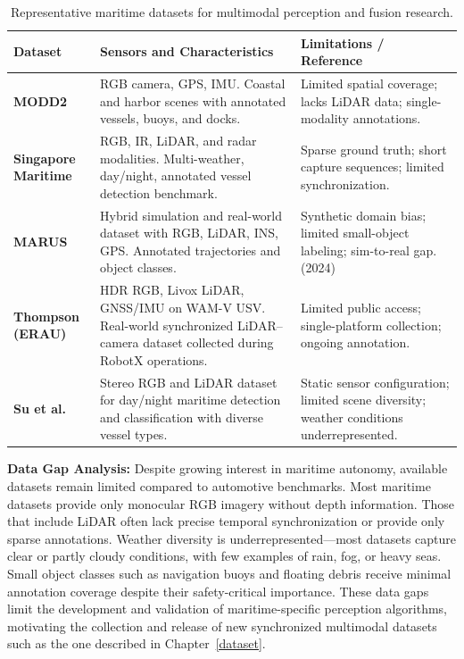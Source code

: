 \documentclass{erauthesis}
\begin{document}
\begin{table}[htbp]
\centering
\caption{Representative maritime datasets for multimodal perception and fusion research.}
\label{table:maritime_datasets}
\renewcommand{\arraystretch}{1.25}
\begin{tabular}{p{3cm} p{5.5cm} p{6.5cm}}
\hline
\textbf{Dataset} & \textbf{Sensors and Characteristics} & \textbf{Limitations / Reference} \\
\hline\hline

\textbf{MODD2} & 
RGB camera, GPS, IMU. Coastal and harbor scenes with annotated vessels, buoys, and docks. &
Limited spatial coverage; lacks LiDAR data; single-modality annotations. \\[2pt]

\textbf{Singapore Maritime} & 
RGB, IR, LiDAR, and radar modalities. Multi-weather, day/night, annotated vessel detection benchmark. &
Sparse ground truth; short capture sequences; limited synchronization. \cite{jun-hwa2022} \\[2pt]

\textbf{MARUS} & 
Hybrid simulation and real-world dataset with RGB, LiDAR, INS, GPS. Annotated trajectories and object classes. &
Synthetic domain bias; limited small-object labeling; sim-to-real gap. (2024) \\[2pt]

\textbf{Thompson (ERAU)} &
HDR RGB, Livox LiDAR, GNSS/IMU on WAM-V USV. Real-world synchronized LiDAR–camera dataset collected during RobotX operations. &
Limited public access; single-platform collection; ongoing annotation. \cite{thompson2023} \\[2pt]

\textbf{Su et al.} &
Stereo RGB and LiDAR dataset for day/night maritime detection and classification with diverse vessel types. &
Static sensor configuration; limited scene diversity; weather conditions underrepresented. \cite{su2023} \\

\hline
\end{tabular}
\end{table}

\textbf{Data Gap Analysis:} Despite growing interest in maritime autonomy, available datasets remain limited compared to automotive benchmarks. Most maritime datasets provide only monocular RGB imagery without depth information. Those that include LiDAR often lack precise temporal synchronization or provide only sparse annotations. Weather diversity is underrepresented—most datasets capture clear or partly cloudy conditions, with few examples of rain, fog, or heavy seas. Small object classes such as navigation buoys and floating debris receive minimal annotation coverage despite their safety-critical importance. These data gaps limit the development and validation of maritime-specific perception algorithms, motivating the collection and release of new synchronized multimodal datasets such as the one described in Chapter~\ref{dataset}.
\end{document}
